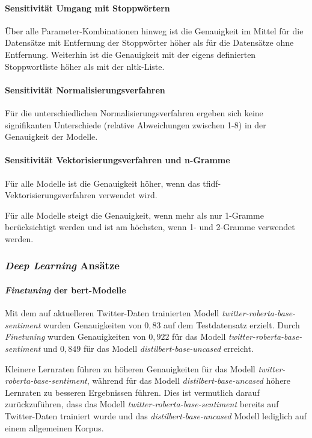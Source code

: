 \paragraph{Sensitivität Umgang mit Stoppwörtern}

Über alle Parameter-Kombinationen hinweg ist die Genauigkeit im Mittel für die Datensätze mit Entfernung der Stoppwörter höher als für die Datensätze ohne Entfernung.
Weiterhin ist die Genauigkeit mit der eigens definierten Stoppwortliste höher als mit der \gls{nltk}-Liste.

\paragraph{Sensitivität Normalisierungsverfahren}

Für die unterschiedlichen Normalisierungsverfahren ergeben sich keine signifikanten Unterschiede (relative Abweichungen zwischen 1-8\textperthousand) in der Genauigkeit der Modelle.

\paragraph{Sensitivität Vektorisierungsverfahren und n-Gramme}

Für alle Modelle ist die Ge\-nauig\-keit höher, wenn das \gls{tfidf}-Vektorisierungsverfahren verwendet wird.

Für alle Modelle steigt die Genauigkeit, wenn mehr als nur 1-Gramme berücksichtigt werden und ist am höchsten, wenn 1- und 2-Gramme verwendet werden.

\subsubsection{\textit{Deep Learning} Ansätze}\label{subsubsec:ergebnisse-deep-learning-ansaetze}

\paragraph{\textit{Finetuning} der \gls{bert}-Modelle}
Mit dem auf aktuelleren Twitter-Daten trainierten Modell \textit{twitter-roberta-base-sentiment} wurden Genauigkeiten von $0,83$ auf dem Testdatensatz erzielt.
Durch \textit{Finetuning} wurden Genauigkeiten von $0,922$ für das Modell \textit{twitter-roberta-base-sentiment} und $0,849$ für das Modell \textit{distilbert-base-uncased} erreicht.

Kleinere Lernraten führen zu höheren Genauigkeiten für das Modell \textit{twitter-roberta-base-sentiment}, während für das Modell \textit{distilbert-base-uncased} höhere Lernraten zu bes\-se\-ren Ergebnissen führen.
Dies ist vermutlich darauf zurückzuführen, dass das Modell \textit{twitter-roberta-base-sentiment} bereits auf Twitter-Daten trainiert wurde und das \textit{distilbert-base-uncased} Modell lediglich auf einem allgemeinen Korpus.

